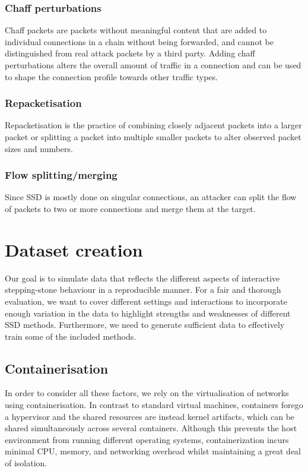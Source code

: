 \documentclass[runningheads]{llncs}\usepackage[]{graphicx}\usepackage[]{color}
\begin{document}
\subsubsection{Chaff perturbations}

Chaff packets are packets without meaningful content that are added to individual connections in a chain without being forwarded, and cannot be distinguished from real attack packets by a third party. Adding chaff perturbations alters the overall amount of traffic in a connection and can be used to shape the connection profile towards other traffic types. 

\subsubsection{Repacketisation}

Repacketisation is the practice of combining closely adjacent packets into a larger packet or splitting a packet into multiple smaller packets to alter observed packet sizes and numbers.

\subsubsection{Flow splitting/merging}

Since SSD is mostly done on singular connections, an attacker can split the flow of packets to two or more connections and merge them at the target. 



\section{Dataset creation}\label{Sec:Datasetcreation}

Our goal is to simulate data that reflects the different aspects of interactive stepping-stone behaviour in a reproducible manner. For a fair and thorough evaluation, we want to cover different settings and interactions to incorporate enough variation in the data to highlight strengths and weaknesses of different SSD methods. Furthermore, we need to generate sufficient data to effectively train some of the included methods. 


\subsection{Containerisation}

In order to consider all these factors, we rely on the virtualisation of networks using containerisation. In contrast to standard virtual machines, containers forego a hypervisor and the shared resources are instead kernel artifacts, which can be shared simultaneously across several containers. Although this prevents the host environment from running different operating systems, containerization incurs minimal CPU, memory, and networking overhead whilst maintaining a great deal of isolation. %
\end{document}
